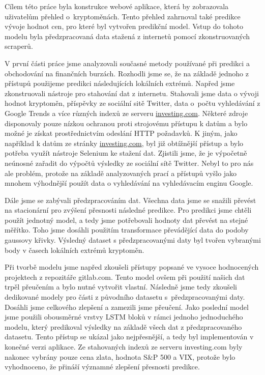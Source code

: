 Cílem této práce byla konstrukce webové aplikace, která by zobrazovala uživatelům přehled o~kryptoměnách. 
Tento přehled zahrnoval také predikce vývoje hodnot cen, pro které byl vytvořen predikční model. 
Vstup do tohoto modelu byla předzpracovaná data stažená z internetů pomocí zkonstruovaných scraperů.

V první části práce jsme analyzovali současné metody používané při predikci a obchodování na finančních burzách.
Rozhodli jsme se, že na základě jednoho z přístupů použijeme predikci následujících lokálních extrémů.
Napřed jsme zkonstruovali nástroje pro stahování dat z internetu. 
Stahovali jsme data o vývoji hodnot kryptoměn, příspěvky ze sociální sitě Twitter, data o~počtu vyhledávání z Google Trends a více různých indexů ze serveru \url{investing.com}.
Některé zdroje disponovaly pouze nízkou ochranou proti strojovému přístupu k datům a bylo možné je získat prostřednictvím odeslání HTTP požadavků.
K jiným, jako například k datům ze stránky \url{investing.com}, byl již obtížnější přístup a bylo potřeba využít nástroje Selenium ke stažení dat.
Zjistili jsme, že je výpočetně neúnosné zařadit do výpočtů výsledky ze sociální sítě Twitter.
Nebyl to pro nás ale problém, protože na základě analyzovaných prací a přístupů vyšlo jako mnohem výhodnější použít data o vyhledávání na vyhledávacím enginu Google.

Dále jsme se zabývali předzpracováním dat. 
Všechna data jsme se snažili převést na stacionární pro zvýšení přesnosti následné predikce.
Pro predikci jsme chtěli použít jednotný model, a tedy jsme potřebovali hodnoty dat převést na stejné měřítko. 
Toho jsme dosáhli použitím transformace převádějící data do podoby gaussovy křivky.
Výsledný dataset s předzpracovanými daty byl tvořen vybranými body v časech lokálních extrémů kryptoměn.

Při tvorbě modelu jsme napřed zkoušeli přístupy popsané ve vysoce hodnocených projektech z repozitáře gitlab.com.
Tento model ovšem při použití našich dat trpěl přeučením a bylo nutné vytvořit vlastní.
Následně jsme tedy zkoušeli dedikované modely pro části z původního datasetu s~předzpracovanými daty.
Dosáhli jsme celkového zlepšení a zamezili jsme přeučení.
Jako poslední model jsme použili obousměrné vrstvy LSTM bloků v rámci jednoho jednoduchého modelu, který predikoval výsledky na základě všech dat z předzpracovaného datasetu.
Tento přístup se ukázal jako nejpřesnější, a tedy byl implementován v konečné verzi aplikace.
Ze stahovaných indexů ze serveru investing.com byly nakonec vybrány pouze cena zlata, hodnota S\&P 500 a VIX, protože bylo vyhodnoceno, že přináší významné zlepšení přesnosti predikce.

